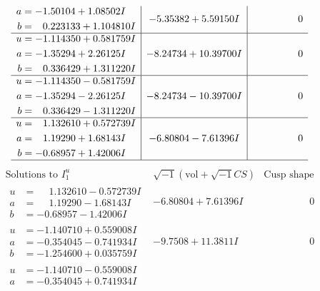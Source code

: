 \documentclass[1p]{elsarticle_modified}
\theoremstyle{definition}
\newcommand{\I}{\sqrt{-1}}
\begin{document}
$$\begin{array}{c|c|c}
\begin{aligned}
a &= -1.50104 + 1.08502 I \\
b &= \phantom{-}0.223133 + 1.104810 I\end{aligned}
 & -5.35382 + 5.59150 I & \phantom{-0.000000 } 0 \\ \hline\begin{aligned}
u &= -1.114350 + 0.581759 I \\
a &= -1.35294 + 2.26125 I \\
b &= \phantom{-}0.336429 + 1.311220 I\end{aligned}
 & -8.24734 + 10.39700 I & \phantom{-0.000000 } 0 \\ \hline\begin{aligned}
u &= -1.114350 - 0.581759 I \\
a &= -1.35294 - 2.26125 I \\
b &= \phantom{-}0.336429 - 1.311220 I\end{aligned}
 & -8.24734 - 10.39700 I & \phantom{-0.000000 } 0 \\ \hline\begin{aligned}
u &= \phantom{-}1.132610 + 0.572739 I \\
a &= \phantom{-}1.19290 + 1.68143 I \\
b &= -0.68957 + 1.42006 I\end{aligned}
 & -6.80804 - 7.61396 I & \phantom{-0.000000 } 0\\
 \hline 
 \end{array}$$\newpage$$\begin{array}{c|c|c}  
\text{Solutions to }I^u_{1}& \I (\text{vol} + \sqrt{-1}CS) & \text{Cusp shape}\\
 \hline 
\begin{aligned}
u &= \phantom{-}1.132610 - 0.572739 I \\
a &= \phantom{-}1.19290 - 1.68143 I \\
b &= -0.68957 - 1.42006 I\end{aligned}
 & -6.80804 + 7.61396 I & \phantom{-0.000000 } 0 \\ \hline\begin{aligned}
u &= -1.140710 + 0.559008 I \\
a &= -0.354045 - 0.741934 I \\
b &= -1.254600 + 0.035759 I\end{aligned}
 & -9.7508 + 11.3811 I & \phantom{-0.000000 } 0 \\ \hline\begin{aligned}
u &= -1.140710 - 0.559008 I \\
a &= -0.354045 + 0.741934 I \\

\end{aligned}
\end{array}$$
\end{document}
